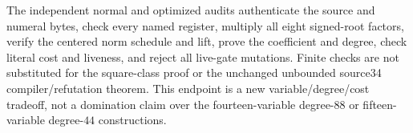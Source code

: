 The independent normal and optimized audits authenticate the source and numeral
bytes, check every named register, multiply all eight signed-root factors,
verify the centered norm schedule and lift, prove the coefficient and degree,
check literal cost and liveness, and reject all live-gate mutations. Finite
checks are not substituted for the square-class proof or the unchanged
unbounded source34 compiler/refutation theorem. This endpoint is a new
variable/degree/cost tradeoff, not a domination claim over the fourteen-variable
degree-$88$ or fifteen-variable degree-$44$ constructions.
